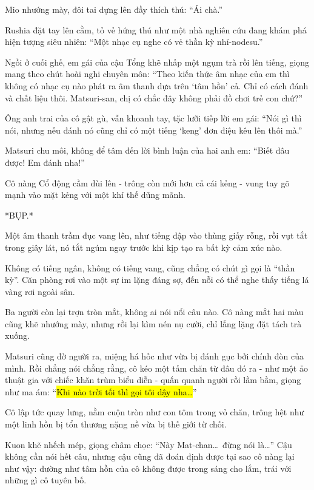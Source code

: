 \documentclass[../main.tex]{subfiles}
\begin{document}

Mio nhướng mày, đôi tai dựng lên đầy thích thú: ``Ái chà.''

Rushia đặt tay lên cằm, tỏ vẻ hứng thú như một nhà nghiên cứu đang khám phá hiện tượng siêu nhiên: ``Một nhạc cụ nghe có vẻ thần kỳ nhỉ-nodesu.''

Ngồi ở cuối ghế, em gái của cậu Tổng khẽ nhấp một ngụm trà rồi lên tiếng, giọng mang theo chút hoài nghi chuyên môn: ``Theo kiến thức âm nhạc của em thì không có nhạc cụ nào phát ra âm thanh dựa trên `tâm hồn' cả. Chỉ có cách đánh và chất liệu thôi. Matsuri-san, chị có chắc đây không phải đồ chơi trẻ con chứ?''

Ông anh trai của cô gật gù, vẫn khoanh tay, tặc lưỡi tiếp lời em gái: ``Nói gì thì nói, nhưng nếu đánh nó cũng chỉ có một tiếng `keng' đơn điệu kêu lên thôi mà.''

Matsuri chu môi, không để tâm đến lời bình luận của hai anh em: ``Biết đâu được! Em đánh nha!''

Cô nàng Cổ động cầm dùi lên - trông còn mới hơn cả cái kẻng - vung tay gõ mạnh vào mặt kẻng với một khí thế dũng mãnh.

*BỤP.*

Một âm thanh trầm đục vang lên, như tiếng đập vào thùng giấy rỗng, rồi vụt tắt trong giây lát, nó tắt ngúm ngay trước khi kịp tạo ra bất kỳ cảm xúc nào.

Không có tiếng ngân, không có tiếng vang, cũng chẳng có chút gì gọi là ``thần kỳ''. Căn phòng rơi vào một sự im lặng đáng sợ, đến nỗi có thể nghe thấy tiếng lá vàng rơi ngoài sân.

Ba người còn lại trợn tròn mắt, không ai nói nổi câu nào. Cô nàng mắt hai màu cũng khẽ nhướng mày, nhưng rồi lại kìm nén nụ cười, chỉ lẳng lặng đặt tách trà xuống.

Matsuri cũng đờ người ra, miệng há hốc như vừa bị đánh gục bởi chính đòn của mình. Rồi chẳng nói chẳng rằng, cô kéo một tấm chăn từ đâu đó ra - như một ảo thuật gia với chiếc khăn trùm biểu diễn - quấn quanh người rồi lầm bầm, giọng như ma ám: ``\hl{Khi nào trời tối thì gọi tôi dậy nha\dots}''

Cô lập tức quay lưng, nằm cuộn tròn như con tôm trong vỏ chăn, trông hệt như một linh hồn bị tổn thương nặng nề vừa bị thế giới từ chối.


Kuon khẽ nhếch mép, giọng châm chọc: ``Này Mat-chan\dots\ đừng nói là\dots'' Cậu không cần nói hết câu, nhưng cậu cũng đã đoán định được tại sao cô nàng lại như vậy: dường như tâm hồn của cô không được trong sáng cho lắm, trái với những gì cô tuyên bố.
\end{document}
